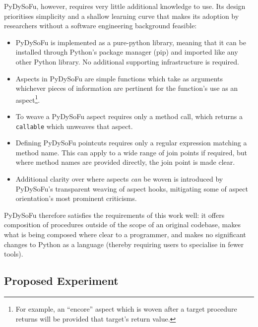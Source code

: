 PyDySoFu, however, requires very little additional knowledge to use. Its design
prioritises simplicity and a shallow learning curve that makes its adoption by
researchers without a software engineering background feasible: 

\begin{itemize}
    \item PyDySoFu is implemented as a pure-python library, meaning that it can
    be installed through Python's package manager (pip) and imported like any
    other Python library. No additional supporting infrastructure is required.
    \item Aspects in PyDySoFu are simple functions which take as arguments
    whichever pieces of information are pertinent for the function's use as an
    aspect\footnote{For example, an ``encore'' aspect which is woven after a
    target procedure returns will be provided that target's return value.}.
    \item To weave a PyDySoFu aspect requires only a method call, which returns a
    \lstinline{callable} which unweaves that aspect.
    \item Defining PyDySoFu pointcuts requires only a regular expression
    matching a method name. This can apply to a wide range of join points if
    required, but where method names are provided directly, the join point is
    made clear.
    \item Additional clarity over where aspects \emph{can} be woven is
    introduced by PyDySoFu's transparent weaving of aspect hooks, mitigating
    some of aspect orientation's most prominent criticisms.
\end{itemize}

PyDySoFu therefore satisfies the requirements of this work well: it offers
composition of procedures outside of the scope of an original codebase, makes
what is being composed where clear to a programmer, and makes no significant
changes to Python as a language (thereby requiring users to specialise in fewer
tools). 


\subsection{Proposed Experiment}\label{subsec:optimisation_with_aspects_experiment}

